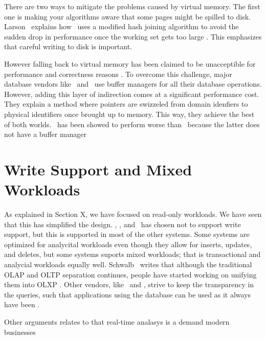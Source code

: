 There are two ways to mitigate the problems caused by virtual memory. The first one is making your algorithms aware that some pages might be spilled to disk. Larson \ea~explains how \mssql~uses a modified hash joining algorithm to avoid the sudden drop in performance once the working set gets too large \cite{Larson2013-mc}. This emphasizes that careful writing to disk is important.

However falling back to virtual memory has been claimed to be unacceptible for performance and correctness reasons \cite{Graefe2014-ds}. To overcome this challenge, major database vendors like \oracle~and \mssql~use buffer managers for all their database operations. However, adding this layer of indirection comes at a significant performance cost. They explain a method where pointers are swizzeled from domain idenfiers to physical identifiers once brought up to memory. This way, they achieve the best of both worlds.  \mssql~has been showed to perform worse than \vertipaq~because the latter does not have a buffer manager \cite{Ferrari2012-hm}


\section{Write Support and Mixed Workloads}
\label{sec:Write Support and Mixed Workloads}
As explained in Section X, we have focused on read-only workloads. We have seen that this has simplified the design. \tableau, \qlikview, and \vertipaq~has chosen not to support write support, but this is supported in most of the other systems.  Some systems are optimized for analycital workloads even though they allow for inserts, updates, and deletes, but some systems suports mixed workloads; that is transactional and analycial workloads equally well. Schwalb \ea~writes that although the traditional OLAP and OLTP separation continues, people have started working on unifying them \cite{Schwalb2014-hn} into OLXP \cite{Plattner2014-fr}. Other vendors, like \oracle~and \saph, strive to keep the transparency in the queries, such that applications using the database can be used as it always have been \cite{Lahiri2015-mz, Farber2012-vh}.

Other arguments relates to that real-time analasys is a demand modern businesses \cite{Primsch2011-ij}

